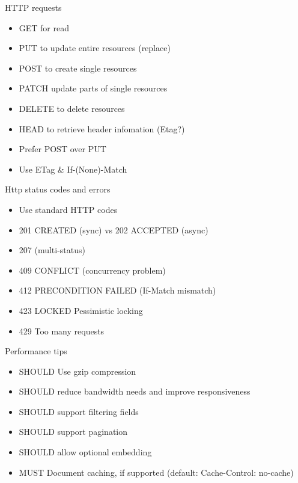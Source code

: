 \documentclass[10pt]{beamer}
\begin{document}
\begin{frame}{HTTP requests}
  \begin{itemize}
    \item GET for read
    \item PUT to update entire resources (replace)
    \item POST to create single resources
    \item PATCH update parts of single resources
    \item DELETE to delete resources
    \item HEAD to retrieve header infomation (Etag?)
    \item Prefer POST over PUT
    \item Use ETag \& If-(None)-Match
  \end{itemize}
\end{frame}

\begin{frame}{Http status codes and errors}
  \begin{itemize}
    \item Use standard HTTP codes
    \item 201 CREATED (sync) vs 202 ACCEPTED (async)
    \item 207 (multi-status)
    \item 409 CONFLICT (concurrency problem)
    \item 412 PRECONDITION FAILED (If-Match mismatch)
    \item 423 LOCKED Pessimistic locking
    \item 429 Too many requests
  \end{itemize}
\end{frame}

\begin{frame}{Performance tips}
  \begin{itemize}
    \item SHOULD Use gzip compression
    \item SHOULD reduce bandwidth needs and improve responsiveness
    \item SHOULD support filtering fields
    \item SHOULD support pagination
    \item SHOULD allow optional embedding
    \item MUST Document caching, if supported (default: Cache-Control: no-cache)
  \end{itemize}
\end{frame}
\end{document}

